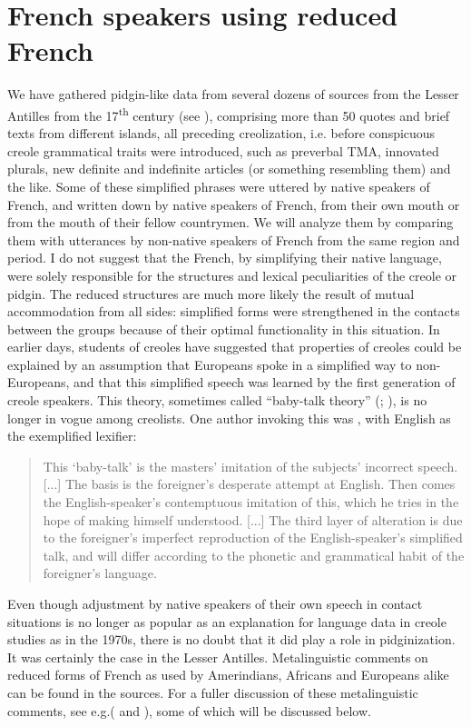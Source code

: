 \documentclass[output=paper,colorlinks,citecolor=brown]{langscibook}
\begin{document}
\section{French speakers using reduced French} \label{sec:bakker:3}
We have gathered pidgin-like data from several dozens of sources from the Lesser Antilles from the 17\textsuperscript{th} century (see \citealt{Bakker2022}), comprising more than 50 quotes and brief texts from different islands, all preceding creolization, i.e. before conspicuous creole grammatical traits were introduced, such as preverbal TMA, innovated plurals, new definite and indefinite articles (or something resembling them) and the like. Some of these simplified phrases were uttered by native speakers of French, and written down by native speakers of French, from their own mouth or from the mouth of their fellow countrymen. We will analyze them by comparing them with utterances by non-native speakers of French from the same region and period.
I do not suggest that the French, by simplifying their native language, were solely responsible for the structures and lexical peculiarities of the creole or pidgin. The reduced structures are much more likely the result of mutual accommodation from all sides: simplified forms were strengthened in the contacts between the groups because of their optimal functionality in this situation. In earlier days, students of creoles have suggested that properties of creoles could be explained by an assumption that Europeans spoke in a simplified way to non-Europeans, and that this simplified speech was learned by the first generation of creole speakers. This theory, sometimes called “baby-talk theory” (\citealt{Velupillai2015}; \citealt[158--159]{Stein2017}), is no longer in vogue among creolists. One author invoking this was \citet[472--473]{Bloomfield1933}, with English as the exemplified lexifier:

\begin{quote}
    This ‘baby-talk’ is the masters’ imitation of the subjects’ incorrect speech. [...] The basis is the foreigner’s desperate attempt at English. Then comes the English-speaker’s contemptuous imitation of this, which he tries in the hope of making himself understood. [...] The third layer of alteration is due to the foreigner’s imperfect reproduction of the English-speaker’s simplified talk, and will differ according to the phonetic and grammatical habit of the foreigner’s language.
\end{quote}

Even though adjustment by native speakers of their own speech in contact situations is no longer as popular as an explanation for language data in creole studies as in the 1970s, there is no doubt that it did play a role in pidginization. It was certainly the case in the Lesser Antilles. Metalinguistic comments on reduced forms of French as used by Amerindians, Africans and Europeans alike can be found in the sources. For a fuller discussion of these metalinguistic comments, see e.g.( \cite{Goodman1964,Hazaël-Massieux1996,Jennings1998,Prudent1999,Hazaël-Massieux2008} and \cite{Thibault2018}), some of which will be discussed below.
\end{document}
